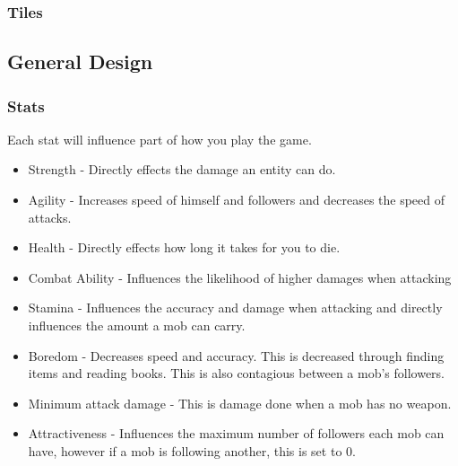 \documentclass[../Main.tex]{subfiles}
\begin{document}
        \subsubsection{Tiles}

    \subsection{General Design}
        \subsubsection{Stats}
            Each stat will influence part of how you play the game. %
            \begin{itemize}
                \item Strength - Directly effects the damage an entity can do.
                \item Agility - Increases speed of himself and followers and decreases the speed of attacks.
                \item Health - Directly effects how long it takes for you to die.
                \item Combat Ability - Influences the likelihood of higher damages when attacking
                \item Stamina - Influences the accuracy and damage when attacking and directly influences the amount a mob can carry.
                \item Boredom - Decreases speed and accuracy. This is decreased through finding items and reading books. This is also contagious between a mob's followers.
                \item Minimum attack damage - This is damage done when a mob has no weapon.
                \item Attractiveness - Influences the maximum number of followers each mob can have, however if a mob is following another, this is set to 0.
            \end{itemize}
\end{document}
